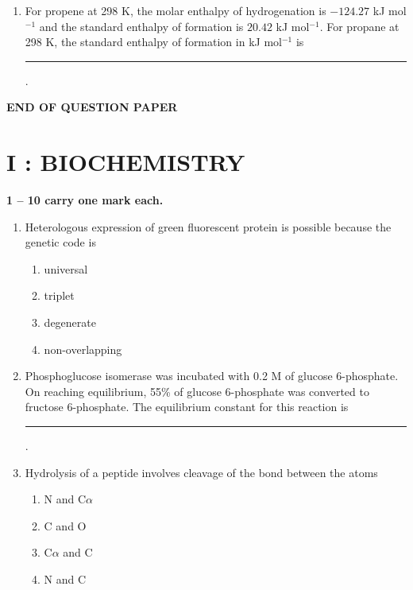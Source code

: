 \documentclass[journal,12pt,onecolumn]{IEEEtran}
\begin{document}
\begin{enumerate}[label=\arabic*.]
\item For propene at 298 K, the molar enthalpy of hydrogenation is $-124.27$ kJ mol$^{-1}$ and the standard enthalpy of formation is $20.42$ kJ mol$^{-1}$. For propane at 298 K, the standard enthalpy of formation in kJ mol$^{-1}$ is \rule{2.5cm}{0.1pt}.
\end{enumerate}
\begin{center}
\textbf{END OF QUESTION PAPER}
\end{center}
\newpage
\section*{\centering I : BIOCHEMISTRY}

\noindent \textbf{ 1 -- 10 carry one mark each.}

\begin{enumerate}[label=\arabic*.]

\item Heterologous expression of green fluorescent protein is possible because the genetic code is

\begin{multicols}{4}
\begin{enumerate}[label=(\Alph*)]
\item universal
\item triplet
\item degenerate
\item non-overlapping
\end{enumerate}
\end{multicols}

\item Phosphoglucose isomerase was incubated with 0.2 M of glucose 6-phosphate.
On reaching equilibrium, 55\% of glucose 6-phosphate was converted to fructose 6-phosphate. The equilibrium constant for this reaction is \rule{2.5cm}{0.1pt}.

\item Hydrolysis of a peptide involves cleavage of the bond between the atoms

\begin{multicols}{4}
\begin{enumerate}[label=(\Alph*)]
\item N and C$\alpha$
\item C and O
\item C$\alpha$ and C
\item N and C
\end{enumerate}
\end{multicols}


\end{enumerate}
\end{document}
